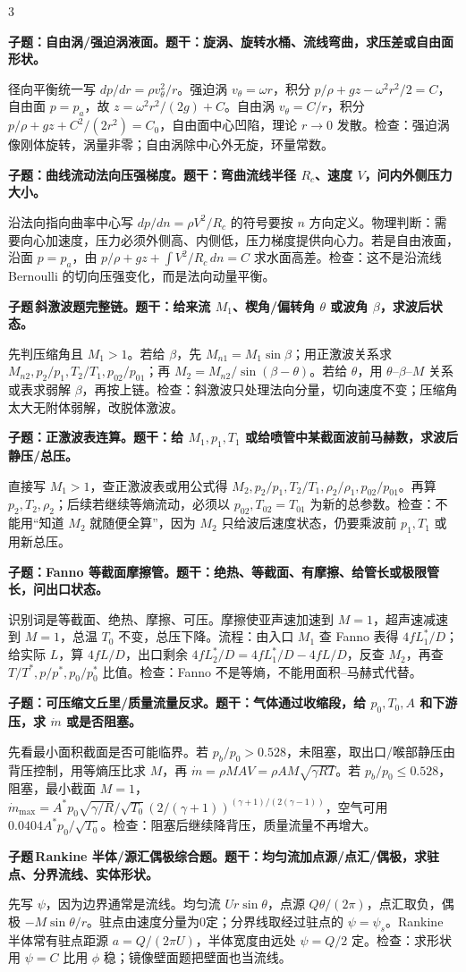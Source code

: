 \documentclass[a4paper]{article}
\newcommand{\qt}[1]{\vspace{0.04pt}\colorbox{Q}{\parbox{\dimexpr\linewidth-2\fboxsep}{\color{white}\bfseries #1}}\par}
\newcommand{\ans}[1]{\colorbox{G}{\parbox{\dimexpr\linewidth-2\fboxsep}{#1}}\par}
\newcommand{\labtag}[3]{{\bfseries\color{#1}\colorbox{#1}{\color{white}\fontsize{2.18}{2.28}\selectfont #2}\,#3}\par}
\newcommand{\subt}[1]{\labtag{Q}{子题}{#1}}
\begin{document}
\begin{multicols}{3}
\qt{子题：自由涡/强迫涡液面。题干：旋涡、旋转水桶、流线弯曲，求压差或自由面形状。}
\ans{径向平衡统一写 $dp/dr=\rho v_\theta^2/r$。强迫涡 $v_\theta=\omega r$，积分 $p/\rho+\!gz-\omega^2r^2/2=C$，自由面 $p=p_a$，故 $z=\omega^2r^2/(2g)+C$。自由涡 $v_\theta=C/r$，积分 $p/\rho+\!gz+C^2/(2r^2)=C_0$，自由面中心凹陷，理论 $r\to0$ 发散。检查：强迫涡像刚体旋转，涡量非零；自由涡除中心外无旋，环量常数。}
\qt{子题：曲线流动法向压强梯度。题干：弯曲流线半径 $R_c$、速度 $V$，问内外侧压力大小。}
\ans{沿法向指向曲率中心写 $dp/dn=\rho V^2/R_c$ 的符号要按 $n$ 方向定义。物理判断：需要向心加速度，压力必须外侧高、内侧低，压力梯度提供向心力。若是自由液面，沿面 $p=p_a$，由 $p/\rho+gz+\int V^2/R_c\,dn=C$ 求水面高差。检查：这不是沿流线 Bernoulli 的切向压强变化，而是法向动量平衡。}
\subt{斜激波题完整链。题干：给来流 $M_1$、楔角/偏转角 $\theta$ 或波角 $\beta$，求波后状态。}
\ans{先判压缩角且 $M_1>1$。若给 $\beta$，先 $M_{n1}=M_1\sin\beta$；用正激波关系求 $M_{n2},p_2/p_1,T_2/T_1,p_{02}/p_{01}$；再 $M_2=M_{n2}/\sin(\beta-\theta)$。若给 $\theta$，用 $\theta$--$\beta$--$M$ 关系或表求弱解 $\beta$，再按上链。检查：斜激波只处理法向分量，切向速度不变；压缩角太大无附体弱解，改脱体激波。}
\qt{子题：正激波表连算。题干：给 $M_1,p_1,T_1$ 或给喷管中某截面波前马赫数，求波后静压/总压。}
\ans{直接写 $M_1>1$，查正激波表或用公式得 $M_2,p_2/p_1,T_2/T_1,\rho_2/\rho_1,p_{02}/p_{01}$。再算 $p_2,T_2,\rho_2$；后续若继续等熵流动，必须以 $p_{02},T_{02}=T_{01}$ 为新的总参数。检查：不能用“知道 $M_2$ 就随便全算”，因为 $M_2$ 只给波后速度状态，仍要乘波前 $p_1,T_1$ 或用新总压。}
\qt{子题：Fanno 等截面摩擦管。题干：绝热、等截面、有摩擦、给管长或极限管长，问出口状态。}
\ans{识别词是等截面、绝热、摩擦、可压。摩擦使亚声速加速到 $M=1$，超声速减速到 $M=1$，总温 $T_0$ 不变，总压下降。流程：由入口 $M_1$ 查 Fanno 表得 $4fL_1^*/D$；给实际 $L$，算 $4fL/D$，出口剩余 $4fL_2^*/D=4fL_1^*/D-4fL/D$，反查 $M_2$，再查 $T/T^*,p/p^*,p_0/p_0^*$ 比值。检查：Fanno 不是等熵，不能用面积--马赫式代替。}
\qt{子题：可压缩文丘里/质量流量反求。题干：气体通过收缩段，给 $p_0,T_0,A$ 和下游压，求 $\dot m$ 或是否阻塞。}
\ans{先看最小面积截面是否可能临界。若 $p_b/p_0>0.528$，未阻塞，取出口/喉部静压由背压控制，用等熵压比求 $M$，再 $\dot m=\rho MAV=\rho A M\sqrt{\gamma RT}$。若 $p_b/p_0\le0.528$，阻塞，最小截面 $M=1$，$\dot m_{\max}=A^*p_0\sqrt{\gamma/R}/\sqrt{T_0}(2/(\gamma+1))^{(\gamma+1)/(2(\gamma-1))}$，空气可用 $0.0404A^*p_0/\sqrt{T_0}$。检查：阻塞后继续降背压，质量流量不再增大。}
\subt{Rankine 半体/源汇偶极综合题。题干：均匀流加点源/点汇/偶极，求驻点、分界流线、实体形状。}
\ans{先写 $\psi$，因为边界通常是流线。均匀流 $Ur\sin\theta$，点源 $Q\theta/(2\pi)$，点汇取负，偶极 $-M\sin\theta/r$。驻点由速度分量为0定；分界线取经过驻点的 $\psi=\psi_s$。Rankine 半体常有驻点距源 $a=Q/(2\pi U)$，半体宽度由远处 $\psi=Q/2$ 定。检查：求形状用 $\psi=C$ 比用 $\phi$ 稳；镜像壁面题把壁面也当流线。}

\end{multicols}
\end{document}
